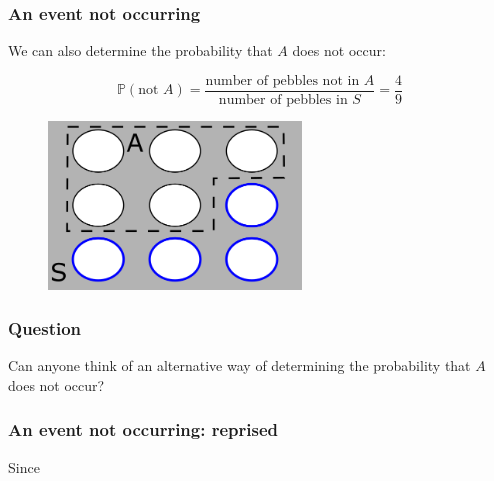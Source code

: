 \documentclass{beamer}
\begin{document}
		\begin{frame}
		\frametitle{An event not occurring}
		We can also determine the probability that $A$ does not occur:
		
		\begin{equation}
			\mathbb{P}(\text{not } A) = \frac{\text{number of pebbles not in } A}{\text{number of pebbles in } S} = \frac{4}{9}
		\end{equation}
		
		\begin{figure}[ht]
			\centerline{\includegraphics[width=0.6\textwidth]{./figures/pebble_world_probnota.png}}
		\end{figure}
		
	\end{frame}

	\begin{frame}
		\frametitle{Question}
		
		\Large Can anyone think of an alternative way of determining the probability that $A$ does not occur?
		
	\end{frame}

	\begin{frame}
		\frametitle{An event not occurring: reprised}
		
		Since 
		
		
	\end{frame}
	
\end{document}
